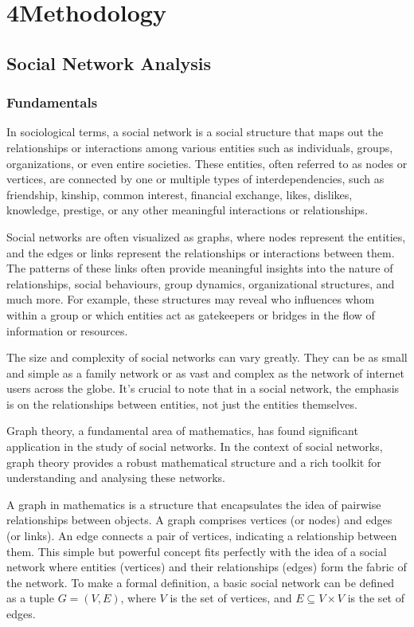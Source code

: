 \chapter{4\quad Methodology}
\label{ch:methods}

\section{Social Network Analysis}
\label{sec:social_networks}

\subsection{Fundamentals}
\label{sec:social_networks_fundamentals}

In sociological terms, a social network is a social structure that maps out the relationships or interactions among various entities such as individuals, groups, organizations, or even entire societies. These entities, often referred to as nodes or vertices, are connected by one or multiple types of interdependencies, such as friendship, kinship, common interest, financial exchange, likes, dislikes, knowledge, prestige, or any other meaningful interactions or relationships.

Social networks are often visualized as graphs, where nodes represent the entities, and the edges or links represent the relationships or interactions between them. The patterns of these links often provide meaningful insights into the nature of relationships, social behaviours, group dynamics, organizational structures, and much more. For example, these structures may reveal who influences whom within a group or which entities act as gatekeepers or bridges in the flow of information or resources.

The size and complexity of social networks can vary greatly. They can be as small and simple as a family network or as vast and complex as the network of internet users across the globe. It's crucial to note that in a social network, the emphasis is on the relationships between entities, not just the entities themselves.

Graph theory, a fundamental area of mathematics, has found significant application in the study of social networks. In the context of social networks, graph theory provides a robust mathematical structure and a rich toolkit for understanding and analysing these networks.

A graph in mathematics is a structure that encapsulates the idea of pairwise relationships between objects. A graph comprises vertices (or nodes) and edges (or links). An edge connects a pair of vertices, indicating a relationship between them. This simple but powerful concept fits perfectly with the idea of a social network where entities (vertices) and their relationships (edges) form the fabric of the network. To make a formal definition, a basic social network can be defined as a tuple $G = (V,E)$, where $V$ is the set of vertices, and $E \subseteq V \times V$ is the set of edges.


